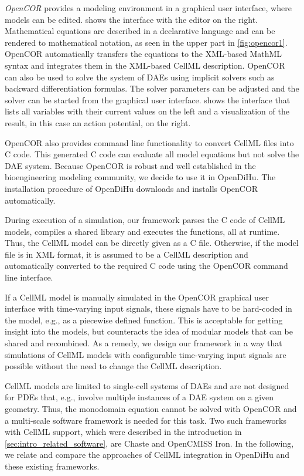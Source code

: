 \emph{OpenCOR} \cite{OpenCOR2015} provides a modeling environment in a graphical user interface, where models can be edited. 
 shows the interface with the editor on the right. Mathematical equations are described in a declarative language and can be rendered to mathematical notation, as seen in the upper part in \cref{fig:opencor1}. OpenCOR automatically transfers the equations to the XML-based MathML syntax and integrates them in the XML-based CellML description.
OpenCOR can also be used to solve the system of DAEs using implicit solvers such as backward differentiation formulas. The solver parameters can be adjusted and the solver can be started from the graphical user interface.  shows the interface that lists all variables with their current values on the left and a visualization of the result, in this case an action potential, on the right.

OpenCOR also provides command line functionality to convert CellML files into C code. This generated C code can evaluate all model equations but not solve the DAE system. Because OpenCOR is robust and well established in the bioengineering modeling community, we decide to use it in OpenDiHu. The installation procedure of OpenDiHu downloads and installs OpenCOR automatically.

During execution of a simulation, our framework parses the C code of CellML models, compiles a shared library and executes the functions, all at runtime. Thus, the CellML model can be directly given as a C file. Otherwise, if the model file is in XML format, it is assumed to be a CellML description and automatically converted to the required C code using the OpenCOR command line interface.

If a CellML model is manually simulated in the OpenCOR graphical user interface with time-varying input signals, these signals have to be hard-coded in the model, e.g., as a piecewise defined function. This is acceptable for getting insight into the models, but counteracts the idea of modular models that can be shared and recombined. 
As a remedy, we design our framework in a way that simulations of CellML models with configurable time-varying input signals are possible without the need to change the CellML description.

CellML models are limited to single-cell systems of DAEs and are not designed for PDEs that, e.g., involve multiple instances of a DAE system on a given geometry. Thus, the monodomain equation cannot be solved with OpenCOR and a multi-scale software framework is needed for this task. Two such frameworks with CellML support, which were described in the introduction in \cref{sec:intro_related_software}, are Chaste and OpenCMISS Iron. In the following, we relate and compare the approaches of CellML integration in OpenDiHu and these existing frameworks.

